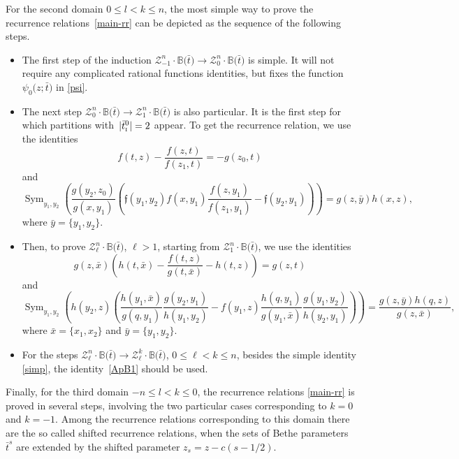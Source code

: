 \documentclass[pdftex]{sigma}
\newcommand{\so}{\scriptscriptstyle \rm I}
\newcommand{\bt}{{\bar t}}
\theoremstyle{definition}
\def\BB{{\mathbb{B}}}
\def\r#1{\eqref{#1}}
\def\sk#1{\left(#1\right)}
\def\fgo{\mathfrak{f}}
\def\Z{\mathcal{Z}}
\begin{document}
For the second domain $0\leq l< k\leq n$, the
 most simple way to prove the recurrence relations~\r{main-rr}
can be depicted as the sequence
of the following steps.

\begin{itemize}\itemsep=0pt
\item The first step of the induction $\Z^n_{-1}\cdot\BB\bigl(\bt\bigr)\to \Z^n_0\cdot\BB\bigl(\bt\bigr)$
is simple. It will not require any complicated rational functions identities,
but fixes the function $\psi_0\bigl(z;\bt\bigr)$ in \r{psi}.
 \item The next step $\Z^n_{0}\cdot\BB\bigl(\bt\bigr)\to \Z^n_1\cdot\BB\bigl(\bt\bigr)$ is also particular.
It is the first step for which partitions with~${|\bar t^0_{\so}|=2}$ appear.
 To get the recurrence relation, we use the identities
\begin{equation}\label{ApB0}
 f(t,z)-\frac{f(z,t)}{f(z_1,t)}=-g(z_0,t)
 \end{equation}
 and
\begin{equation}\label{ApB4}
 \mathop{\operatorname{ Sym}}_{y_1,y_2}\left(\frac{g(y_2,z_0)}{g(x,y_1)}
 \left(
 \fgo(y_1,y_2) f(x,y_1) \frac{f(z,y_1)}{f(z_1,y_1)} - \fgo(y_2,y_1)
 \right)\right)= g(z,\bar y) h(x,z) ,
 \end{equation}
 where $\bar y=\{y_1,y_2\}$.\item Then, to prove $\Z^n_\ell\cdot\BB\bigl(\bt\bigr)$, $\ell>1$, starting from $\Z^n_1\cdot\BB\bigl(\bt\bigr)$,
 we use the identities
\begin{equation}\label{ApB2}
g(z,\bar x)\sk{h(t,\bar x)-\frac{f(t,z)}
{g(t,\bar x)}-h(t,z)}=g(z,t)
\end{equation}
and
\begin{equation}\label{ApB3}
\mathop{\operatorname{ Sym}}_{y_1,y_2}\sk{h(y_2,z)
\sk{\frac{h(y_1,\bar x)}{g(q,y_1)} \frac{g(y_2,y_1)}{h(y_1,y_2)}
- f(y_1,z)
\frac{h(q,y_1)}{g(y_1,\bar x)} \frac{g(y_1,y_2)}{h(y_2,y_1)}}}=
\frac{g(z,\bar y)h(q,z)}{g(z,\bar x)} ,
\end{equation}
where $\bar x=\{x_1,x_2\}$ and $\bar y=\{y_1,y_2\}$.
\item For the steps $\Z^n_{\ell}\cdot\BB\bigl(\bt\bigr)\to \Z^k_\ell\cdot\BB\bigl(\bt\bigr)$, $0\leq \ell<k\leq n$,
besides the simple identity \r{simp}, the identity~\r{ApB1} should be used.
\end{itemize}

Finally, for the third domain $-n\leq l< k\leq 0$, the recurrence relations \r{main-rr}
 is proved in several steps, involving the two particular cases corresponding to
$k=0$ and $k=-1$.
Among the recurrence relations corresponding to this domain there are the
 so called shifted recurrence relations, when
the sets of Bethe parameters $\bt^s$ are extended by the shifted parameter
$z_s=z-c(s-1/2)$.
\end{document}
